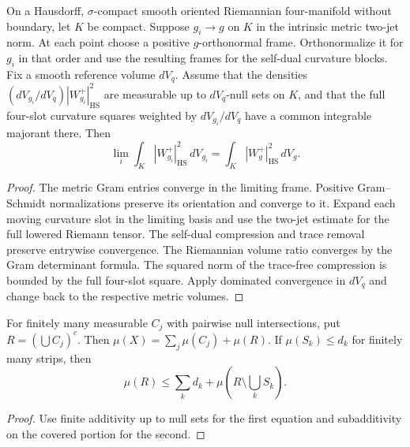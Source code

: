 \begin{theorem}
\label{thm:physical-compact-energy}
\leanok
On a Hausdorff, $\sigma$-compact smooth oriented Riemannian four-manifold
without boundary, let $K$ be compact. Suppose $g_i\to g$ on $K$ in the intrinsic metric two-jet norm.
At each point choose a positive $g$-orthonormal frame. Orthonormalize it
for $g_i$ in that order and use the resulting frames for the self-dual
curvature blocks. Fix a smooth reference volume $dV_q$. Assume that
the densities $(dV_{g_i}/dV_q)|W^+_{g_i}|_{\mathrm{HS}}^2$ are
measurable up to $dV_q$-null sets on $K$, and that the full four-slot
curvature squares weighted by $dV_{g_i}/dV_q$ have a common integrable
majorant there. Then
\[
 \lim_i\int_K |W^+_{g_i}|_{\mathrm{HS}}^2\,dV_{g_i}
       =\int_K |W^+_g|_{\mathrm{HS}}^2\,dV_g.
\]
\end{theorem}
\begin{proof}
\leanok
The metric Gram entries converge in the limiting frame. Positive
Gram--Schmidt normalizations preserve its orientation and converge to it.
Expand each moving curvature slot in the limiting basis and use the
two-jet estimate for the full lowered Riemann tensor. The self-dual
compression and trace removal preserve entrywise convergence. The
Riemannian volume ratio converges by the Gram determinant formula.
The squared norm of the trace-free compression is bounded by the full
four-slot square. Apply dominated convergence in $dV_q$ and change back to the respective
metric volumes.
\end{proof}

\begin{lemma}
\label{lem:source-remainder-split}
\leanok
For finitely many measurable $C_j$ with pairwise null intersections,
put $R=(\bigcup C_j)^c$. Then $\mu(X)=\sum_j\mu(C_j)+\mu(R)$.
If $\mu(S_k)\le d_k$ for finitely many strips, then
\[
 \mu(R)\le\sum_k d_k+\mu(R\setminus\textstyle\bigcup_k S_k).
\]
\end{lemma}
\begin{proof}
\leanok
Use finite additivity up to null sets for the first equation and
subadditivity on the covered portion for the second.
\end{proof}


